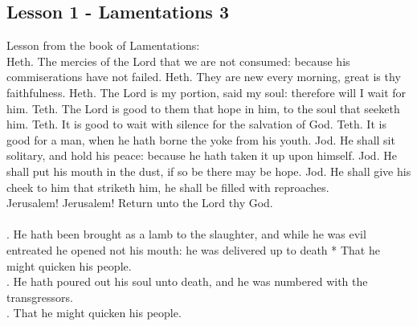 \subsection{Lesson 1 - Lamentations 3}
\begin{Parallel}[v]{\colw}{\colx}
{}
{\vern
{\noindent
Lesson from the book of Lamentations:\\
Heth. The mercies of the Lord that we are not consumed: because his commiserations have not failed.
Heth. They are new every morning, great is thy faithfulness.
Heth. The Lord is my portion, said my soul: therefore will I wait for him.
Teth. The Lord is good to them that hope in him, to the soul that seeketh him.
Teth. It is good to wait with silence for the salvation of God.
Teth. It is good for a man, when he hath borne the yoke from his youth.
Jod. He shall sit solitary, and hold his peace: because he hath taken it up upon himself.
Jod. He shall put his mouth in the dust, if so be there may be hope.
Jod. He shall give his cheek to him that striketh him, he shall be filled with reproaches.\\
Jerusalem! Jerusalem! Return unto the Lord thy God.\\ \\
\Rbar. He hath been brought as a lamb to the slaughter, and while he was evil entreated he opened not his mouth: he was delivered up to death
* That he might quicken his people.\\
\Vbar. He hath poured out his soul unto death, and he was numbered with the transgressors.\\
\Rbar. That he might quicken his people.}
}

\end{Parallel}